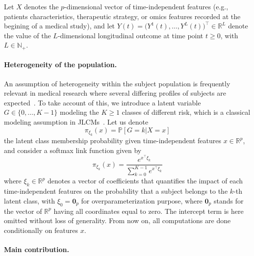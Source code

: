 \documentclass[11pt]{article}
\newcommand{\R}{\mathds R}
\newcommand{\N}{\mathds N}
\renewcommand{\P}{\mathds P}
\begin{document}
Let $X$ denotes the $p$-dimensional vector of time-independent features (e.g., patients characteristics, therapeutic strategy, or omics features recorded at the begining of a medical study), and let  $Y(t) = \big(Y^1(t), \ldots, Y^L(t) \big)^\top \in \R^L$ denote the value of the $L$-dimensional longitudinal outcome at time point $t \geq 0$, with $L \in \N_+$.

\paragraph{Heterogeneity of the population.}

An assumption of heterogeneity within the subject population is frequently relevant in medical research where several differing profiles of subjects are expected~\citep{bussy2019c}. To take account of this, we introduce a latent variable $G \in \{0, \ldots, K-1\}$ modeling the $K \geq 1$ classes of different risk, which is a classical modeling assumption in JLCMs~\citep{lin2002latent, proust2014joint}. Let us denote
\begin{equation}
  \label{eq:pi}
  \pi_{\xi_k}(x) = \P[G=k|X=x]
\end{equation}
the latent class membership probability given time-independent features $x \in \R^p$, and consider a softmax link function given by
\begin{equation}
  \label{eq:pi-softmax} 
  \pi_{\xi_k}(x) = \dfrac{e^{x^\top\xi_k}}{\sum_{k=0}^{K-1}e^{x^\top\xi_k}}
\end{equation}
where $\xi_k \in \R^p$ denotes a vector of coefficients that quantifies the impact of each time-independent features on the probability that a subject belongs to the $k$-th latent class, with $\xi_0 = \mathbf{0}_p$ for overparameterization purpose, where $\mathbf{0}_p$ stands for the vector of $\R^p$ having all coordinates equal to zero. The intercept term is here omitted without loss of generality. 
From now on, all computations are done conditionally on features $x$.

\paragraph{Main contribution.} 
\end{document}
